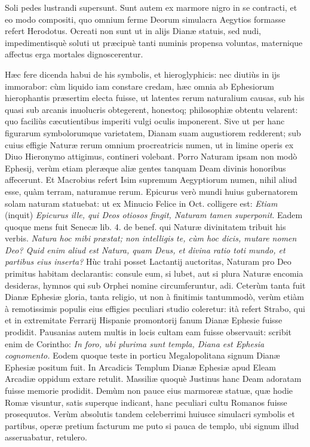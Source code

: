 \documentclass[a4paper, 11pt, oneside, polutonikogreek, latin]{article}
\begin{document}
Soli pedes lustrandi supersunt. Sunt autem ex marmore nigro in se contracti, et eo modo compositi, quo omnium ferme Deorum simulacra Aegytios formasse refert Herodotus. Ocreati non sunt ut in alijs Dianæ statuis, sed nudi, impedimentisquè soluti ut præcipuè tanti numinis propensa voluntas, maternique affectus erga mortales dignoscerentur.

Hæc fere dicenda habui de his symbolis, et hieroglyphicis: nec diutiùs in ijs immorabor: cùm liquido iam constare credam, hæc omnia ab Ephesiorum hierophantis præsertim electa fuisse, ut latentes rerum naturalium causas, sub his quasi sub arcanis inuolucris obtegerent, honestoq; philosophiæ obtentu velarent: quo faciliùs cæcutientibus imperiti vulgi oculis imponerent. Sive ut per hanc figurarum symbolorumque varietatem, Dianam suam augustiorem redderent; sub cuius effigie Naturæ rerum omnium procreatricis numen, ut in limine operis ex Diuo Hieronymo attigimus, contineri volebant. Porro Naturam ipsam non modò Ephesij, verùm etiam pleræque aliæ gentes tanquam Deam divinis honoribus affecerunt. Et Macrobius refert Isim supremum Aegyptiorum numen, nihil aliud esse, quàm terram, naturamue rerum. Epicurus verò mundi huius gubernatorem solam naturam statuebat: ut ex Minucio Felice in Oct. colligere est: \emph{Etiam} (inquit) \emph{Epicurus ille, qui Deos otiosos fingit, Naturam tamen superponit}. Eadem quoque mens fuit Senecæ lib. 4. de benef. qui Naturæ divinitatem tribuit his verbis. \emph{Natura hoc mibi præstat; non intelligis te, cùm hoc dicis, mutare nomen Deo? Quid enim aliud est Natura, quam Deus, et divina ratio toti mundo, et partibus eius inserta?} Hùc trahi posset Lactantij auctoritas, Naturam pro Deo primitus habitam declarantis: consule eum, si lubet, aut si plura Naturæ encomia desideras, hymnos qui sub Orphei nomine circumferuntur, adi. Ceterùm tanta fuit Dianæ Ephesiæ gloria, tanta religio, ut non à finitimis tantummodò, verùm etiàm à remotissimis populis eius effigies peculiari studio coleretur: ità refert Strabo, qui et in extremitate Ferrarij Hispanie promontorij fanum Dianæ Ephesie fuisse prodidit. Pausanias autem multis in locis cultam eam fuisse observauit: scribit enim de Corintho: \emph{In foro, ubi plurima sunt templa, Diana est Ephesia cognomento.} Eodem quoque teste in porticu Megalopolitana signum Dianæ Ephesiæ positum fuit. In Arcadicis Templum Dianæ Ephesiæ apud Eleam Arcadiæ oppidum extare retulit. Massiliæ quoquè Justinus hanc Deam adoratam fuisse memorie prodidit. Demùm non pauce eius marmoreæ statuæ, quæ hodie Romæ visuntur, satis superque indicant, hanc peculiari cultu Romanos fuisse prosequutos. Verùm absolutis tandem celeberrimi huiusce simulacri symbolis et partibus, operæ pretium facturum me puto si pauca de templo, ubi signum illud asseruabatur, retulero.
\clearpage
\end{document}
